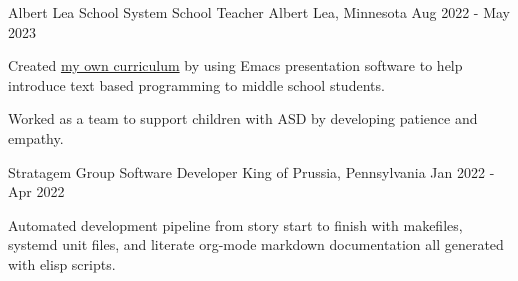 

\begin{cventries}

  \cventry
    {Albert Lea School System} %
    {School Teacher} %
    {Albert Lea, Minnesota} %
    {Aug 2022 - May 2023} %
    {
      \begin{cvitems} %
        \item {Created \href{https://github.com/asamwow/introduction-to-programming}{my own curriculum} by using Emacs presentation software to help introduce text based programming to middle school students.}
        \item {Worked as a team to support children with ASD by developing patience and empathy.}
      \end{cvitems}
    }

  \cventry
    {Stratagem Group} %
    {Software Developer} %
    {King of Prussia, Pennsylvania} %
    {Jan 2022 - Apr 2022} %
    {
      \begin{cvitems} %
        \item {Automated development pipeline from story start to finish
               with makefiles, systemd unit files, and literate org-mode markdown documentation
               all generated with elisp scripts.}
      \end{cvitems}
    }



\end{cventries}
